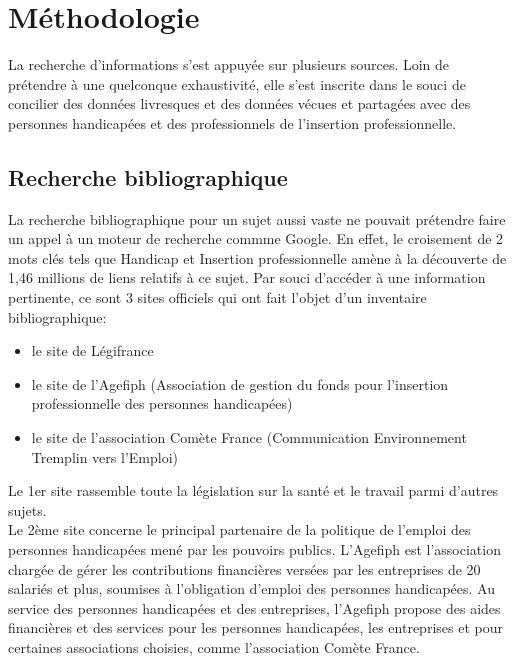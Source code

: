 \chapter{Méthodologie}

La recherche d'informations s'est appuyée sur plusieurs sources. Loin de prétendre à une quelconque exhaustivité, elle s'est inscrite dans le souci de concilier des données livresques et des données vécues et partagées avec des personnes handicapées et des professionnels de l'insertion professionnelle.

\section{Recherche bibliographique}
La recherche bibliographique pour un sujet aussi vaste ne pouvait prétendre faire un appel à un moteur de recherche commme Google. En effet, le croisement de 2 mots clés tels que Handicap et Insertion professionnelle amène à la découverte de 1,46 millions de liens relatifs à ce sujet. 
Par souci d'accéder à une information pertinente, ce sont 3 sites officiels qui ont fait l'objet d'un inventaire bibliographique: 

\begin{itemize}
\item le site de Légifrance
\item le site de l'Agefiph (Association de gestion du fonds pour l'insertion professionnelle des personnes handicapées)
\item le site de l'association Comète France (Communication Environnement Tremplin vers l'Emploi)\\
\end{itemize}


Le 1er site rassemble toute la législation sur la santé et le travail parmi d'autres sujets.\\

Le 2ème site concerne le principal partenaire de la politique de l'emploi des personnes handicapées mené par les pouvoirs publics. L'Agefiph est l'association chargée de gérer les contributions financières versées par les entreprises de 20 salariés et plus, soumises à l'obligation d'emploi des personnes handicapées. Au service des personnes handicapées et des entreprises, l'Agefiph propose des aides financières et des services pour les personnes handicapées, les entreprises et pour certaines associations choisies, comme l'association Comète France.\\

